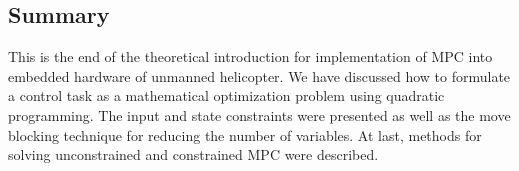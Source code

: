\subsection{Summary}

This is the end of the theoretical introduction for implementation of MPC into embedded hardware of unmanned helicopter. We have discussed how to formulate a control task as a mathematical optimization problem using quadratic programming. The input and state constraints were presented as well as the move blocking technique for reducing the number of variables. At last, methods for solving unconstrained and constrained MPC were described.